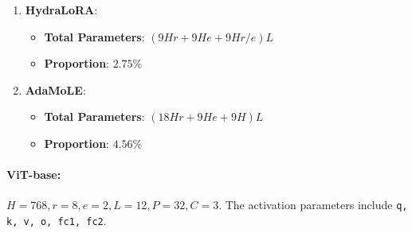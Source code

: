 \begin{enumerate}
    \item \textbf{HydraLoRA}:
    \begin{itemize}
        \item \textbf{Total Parameters}: \( (9Hr + 9He + 9Hr/e)L \)
        \item \textbf{Proportion}: \( 2.75\% \)
    \end{itemize}

    \item \textbf{AdaMoLE}:
    \begin{itemize}
        \item \textbf{Total Parameters}: \( (18Hr + 9He + 9H)L \)
        \item \textbf{Proportion}: \( 4.56\% \)
    \end{itemize}
\end{enumerate}

\paragraph{ViT-base:} $H=768, r=8, e=2, L=12, P=32, C=3$. The activation parameters include \texttt{q, k, v, o, fc1, fc2}.

